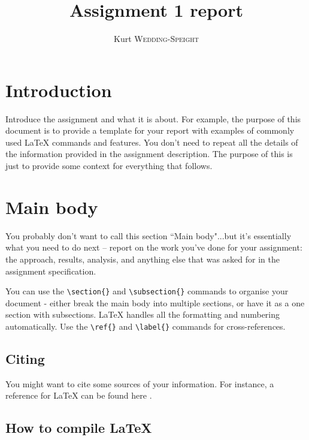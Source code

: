 \documentclass[12pt]{article}
\title{Assignment 1 report}
\author{Kurt \textsc{Wedding-Speight}}
\begin{document}
\maketitle


\section{Introduction}

Introduce the assignment and what it is about. For example, the purpose of this document is to provide a template for your report with examples of commonly used \LaTeX{} commands and features.  You don't need to repeat all the details of the information provided in the assignment description.  The purpose of this is just to provide some context for everything that follows.   

\section{Main body}

You probably don't want to call this section ``Main body"...but it's essentially what you need to do next --  report on the work you've done for your assignment: the approach, results, analysis, and anything else that was asked for in the assignment specification.  

You can use the \verb$\section{}$ and \verb$\subsection{}$ commands to organise your document - either break the main body into multiple sections, or have it as a one section with subsections.   \LaTeX{} handles all the formatting and numbering automatically. Use the \verb$\ref{}$ and \verb$\label{}$ commands for cross-references.  

\subsection{Citing}

You might want to cite some sources of your information.  For instance, a reference for \LaTeX{} can be found here \cite{latexcompanion}.

\subsection{How to compile \LaTeX{}}
\end{document}
